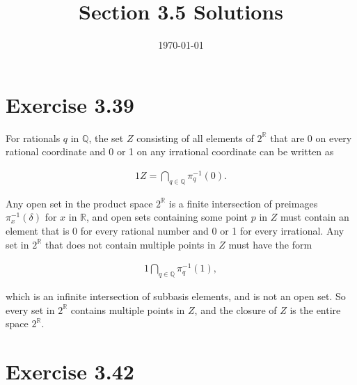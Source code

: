 \documentclass{article}
\title{\textbf{Section 3.5 Solutions}}
\date{}
\date\today
\begin{document}
\maketitle %

\thispagestyle{firstpage}
\section*{Exercise 3.39}

For rationals $q$ in $\mathbb{Q}$, the set $Z$ consisting of all elements of $2^{\mathbb{R}}$ that are 0 on every rational coordinate 
and 0 or 1 on any irrational coordinate can be written as 

\begin{alignat*}{1}
  Z = \bigcap_{q \in \mathbb{Q}} \pi^{-1}_q(0).
\end{alignat*}

Any open set in the product space $2^{\mathbb{R}}$ is a finite intersection of preimages $\pi^{-1}_x(\delta)$ for $x$ in $\mathbb{R}$, and  
open sets containing some point $p$ in $Z$ must contain an element that is 0 for every rational number and 0 or 1 for every irrational.  
Any set in $2^{\mathbb{R}}$ that does not contain multiple points in $Z$ must have the form 

\begin{alignat*}{1}
  \bigcap_{q \in \mathbb{Q}} \pi^{-1}_q(1), 
\end{alignat*}

which is an infinite intersection of subbasis elements, and is not an open set.  So every set in $2^{\mathbb{R}}$ 
contains multiple points in $Z$, and the closure of $Z$ is the entire space $2^{\mathbb{R}}$.

\section*{Exercise 3.42} 
\end{document}
